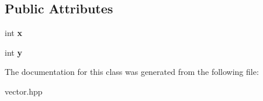 \subsection*{Public Attributes}
\begin{DoxyCompactItemize}
\item 
\mbox{\label{classvector_a0403eb3aea23a3009e276fba1d317046}} 
int {\bfseries x}
\item 
\mbox{\label{classvector_aad6de640298eae97ca0a094db5aff477}} 
int {\bfseries y}
\end{DoxyCompactItemize}


The documentation for this class was generated from the following file\+:\begin{DoxyCompactItemize}
\item 
vector.\+hpp\end{DoxyCompactItemize}
